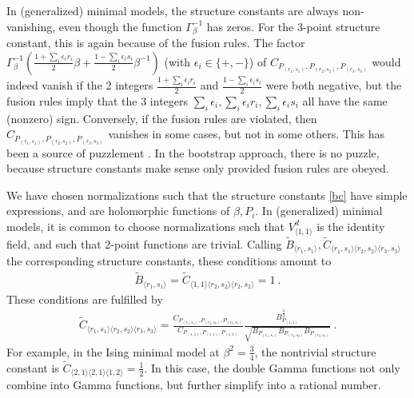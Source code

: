 \documentclass[12pt, a4paper]{article}
\begin{document}
In (generalized) minimal models, the structure constants are always non-vanishing, even though the function $\Gamma_\beta^{-1}$ has zeros. For the 3-point structure constant, this is again because of the fusion rules. 
The factor $\Gamma_\beta^{-1}\left(\frac{1+\sum_i\epsilon_ir_i}{2}\beta + \frac{1-\sum_i \epsilon_is_i}{2}\beta^{-1}\right)$ (with $\epsilon_i\in \{+,-\}$) of $C_{P_{(r_1,s_1)},P_{(r_2,s_2)},P_{(r_3,s_3)}}$ would indeed vanish if the 2 integers $\frac{1+\sum_i\epsilon_ir_i}{2}$ and $\frac{1-\sum_i \epsilon_is_i}{2}$ were both negative, but the fusion rules imply that the 3 integers $\sum_i\epsilon_i,\sum_i\epsilon_ir_i,\sum_i\epsilon_is_i$ all have the same (nonzero) sign. Conversely, if the fusion rules are violated, then $C_{P_{(r_1,s_1)},P_{(r_2,s_2)},P_{(r_3,s_3)}}$ vanishes in some cases, but not in some others. This has been a source of puzzlement \cite{zam05}. In the bootstrap approach, there is no puzzle, because structure constants make sense only provided fusion rules are obeyed. 

We have chosen normalizations such that the structure constants \eqref{bc} have simple expressions, and are holomorphic functions of $\beta,P_i$. In (generalized) minimal models, it is common to choose normalizations such that $V^d_{\langle 1,1\rangle}$ is the identity field, and such that 2-point functions are trivial. Calling $\widetilde{B}_{\langle r_1,s_1\rangle},\widetilde{C}_{\langle r_1,s_1\rangle\langle r_2,s_2\rangle \langle r_3,s_3\rangle}$ the corresponding structure constants, these conditions amount to 
\begin{align}
 \widetilde{B}_{\langle r_1,s_1\rangle} = \widetilde{C}_{\langle 1,1\rangle\langle r_2,s_2\rangle \langle r_2,s_2\rangle} = 1\ .
\end{align}
These conditions are fulfilled by 
\begin{align}
 \widetilde{C}_{\langle r_1,s_1\rangle\langle r_2,s_2\rangle \langle r_3,s_3\rangle} 
 = \frac{C_{P_{(r_1,s_1)},P_{(r_2,s_2)},P_{(r_3,s_3)}}}{C_{P_{(1,1)},P_{(1,1)},P_{(1,1)}}}
 \frac{B_{P_{(1,1)}}^\frac32}
 {\sqrt{B_{P_{(r_1,s_1)}}B_{P_{(r_2,s_2)}} B_{P_{(r_3,s_3)}}}}\ .
 \label{wtc}
\end{align}
For example, in the Ising minimal model at $\beta^2=\frac34$, the nontrivial structure constant is $\widetilde{C}_{\langle 2,1\rangle\langle 2,1\rangle\langle 1,2\rangle}=\frac12$. In this case, the double Gamma functions not only combine into Gamma functions, but further simplify into a rational number. 
\end{document}
